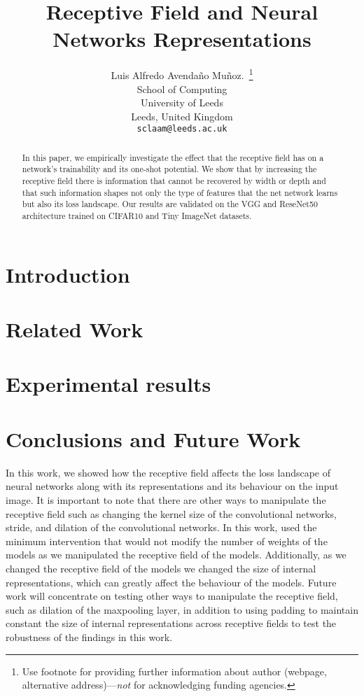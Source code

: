 \documentclass{article}
\title{Receptive Field and Neural Networks Representations}
\author{%
  Luis Alfredo Avendaño Muñoz.~\thanks{Use footnote for providing further information
    about author (webpage, alternative address)---\emph{not} for acknowledging
    funding agencies.} \\
  School of Computing\\
  University of Leeds\\
  Leeds, United Kingdom \\
  \texttt{sclaam@leeds.ac.uk} \\
}
\begin{document}
\maketitle


\begin{abstract}
In this paper, we empirically investigate the effect that the receptive field has on a network's trainability and its one-shot potential. We show that by increasing the receptive field there is information that cannot be recovered by width or depth and that such information shapes not only the type of features that the net network learns but also its loss landscape.
Our results are validated on the VGG and ReseNet50 architecture trained on CIFAR10 and Tiny ImageNet datasets.



\end{abstract}

\section{Introduction}

\section{Related Work}

\section{Experimental results}

\section{Conclusions and Future Work}
\label{sec:conclusion}



 In this work, we showed how the receptive field affects the loss landscape of neural networks along with its representations and its behaviour on the input image.
It is important to note that there are other ways to manipulate the receptive field such as changing the kernel size of the
convolutional networks, stride, and dilation of the convolutional networks. In this work, used the minimum
intervention that would not modify the number of weights of the models as we manipulated the receptive field of the
models. Additionally, as we changed the receptive field of the models we changed the  size of internal representations,
which can greatly affect the behaviour of the models. Future work will concentrate on testing other ways to manipulate
the receptive field, such as dilation of the maxpooling layer, in addition to using padding to maintain constant the
size
of internal representations across receptive fields to test the robustness of the findings in this work.
\end{document}
